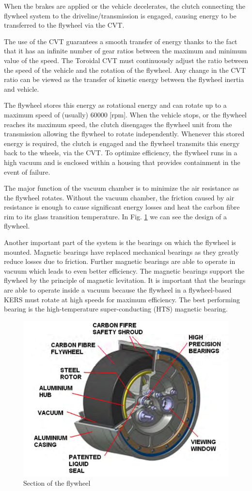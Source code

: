 \documentclass[11pt]{article}
\begin{document}
When the brakes are applied or the vehicle decelerates, the clutch connecting the flywheel system to the driveline/transmission is engaged, causing energy to be transferred to the flywheel via the CVT. 

The use of the CVT guarantees a smooth transfer of energy thanks to the fact that it has an infinite number of gear ratios between the maximum and minimum value of the speed. The Toroidal CVT must continuously adjust the ratio between the speed of the vehicle and the rotation of the flywheel. Any change in the CVT ratio can be viewed as the transfer of kinetic energy between the flywheel inertia and vehicle.

The flywheel stores this energy as rotational energy and can rotate up to a maximum speed of (usually) $60000$ [rpm]. When the vehicle stops, or the flywheel reaches its maximum speed, the clutch disengages the flywheel unit from the transmission allowing the flywheel to rotate independently. Whenever this stored energy is required, the clutch is engaged and the flywheel transmits this energy back to the wheels, via the CVT. To optimize efficiency, the flywheel runs in a high vacuum and is enclosed within a housing that provides containment in the event of failure.

The major function of the vacuum chamber is to minimize the air resistance as the flywheel rotates. Without the vacuum chamber, the friction caused by air resistance is enough to cause significant energy losses and heat the carbon fibre rim to its glass transition temperature. In Fig. \ref{fig: Flywheel} we can see the design of a flywheel.

Another important part of the system is the bearings on which the flywheel is mounted. Magnetic bearings have replaced mechanical bearings as they greatly reduce losses due to friction. Further magnetic bearings are able to operate in vacuum which leads to even better efficiency. The magnetic bearings support the flywheel by the principle of magnetic levitation. It is important that the bearings are able to operate inside a vacuum because the flywheel in a flywheel-based KERS must rotate at high speeds for maximum efficiency. The best performing bearing is the high-temperature super-conducting (HTS) magnetic bearing.

\begin{figure}[H]
\centering
\includegraphics[width=.6\textwidth]{Images/State_of_the_art/Flywheel_Components.png}
\caption{Section of the flywheel}
\label{fig: Flywheel}
\end{figure}
\end{document}
